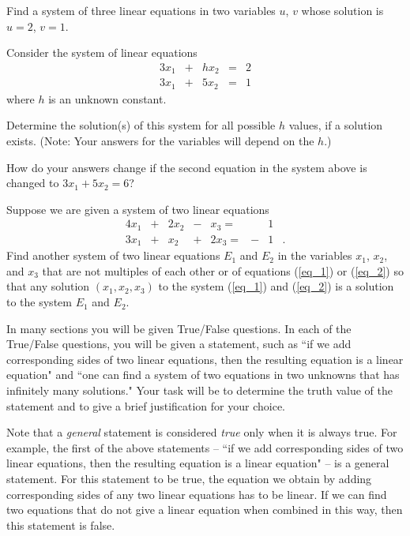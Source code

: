 \item Find a system of three linear equations in two variables $u$, $v$ whose solution is $u=2$, $v=1$.

\item Consider the system of linear equations
\begin{alignat*}{3}
x_1 	& {}+{} & hx_2 & {}={} & 2 \\
3x_1 	& {}+{} & 5x_2 & {}={} & 1 
\end{alignat*}
where $h$ is an unknown constant. 
	\ba
	\item  Determine the solution(s) of this system for all possible $h$ values, if a solution exists. (Note: Your answers for the variables will depend on the $h$.)
	\item How do your answers change if the second equation in the system above is changed to $3x_1+5x_2=6$?\\
	
	\ea
	
\item Suppose we are given a system of two linear equations
\begin{alignat}{4}
x_1 	& {}+{} & 2x_2 	& {}-{} 	& x_3{}={} 	& { } &1&{} \label{eq_1} \\
3x_1 	& {}+{} & x_2 	& {}+{} 	& 2x_3{}={} 	& {-} &1&. \label{eq_2} 
\end{alignat}
Find another system of two linear equations $E_1$ and $E_2$ in the variables $x_1$, $x_2$, and $x_3$ that are not multiples of each other or of equations (\ref{eq_1}) or (\ref{eq_2}) so that any solution $(x_1, x_2, x_3)$ to the system (\ref{eq_1}) and (\ref{eq_2}) is a solution to the system $E_1$ and $E_2$. 

\ee

\label{sec:intro_le_tf}

In many sections you will be given True/False questions. In each of the True/False questions, you will be given a statement, such as ``if we add corresponding sides of two linear equations, then the resulting equation is a linear equation" and ``one can find a system of two equations in two unknowns that has infinitely many solutions." Your task will be to determine the truth value of the statement and to give a brief justification for your choice.



Note that a {\em general} statement is considered {\em true} only when it is always true. For example, the first of the above statements -- ``if we add corresponding sides of two linear equations, then the resulting equation is a linear equation" -- is a general statement. For this statement to be true, the equation we obtain by adding corresponding sides of any two linear equations has to be linear. If we can find two equations that do not give a linear equation when combined in this way, then this statement is false.




